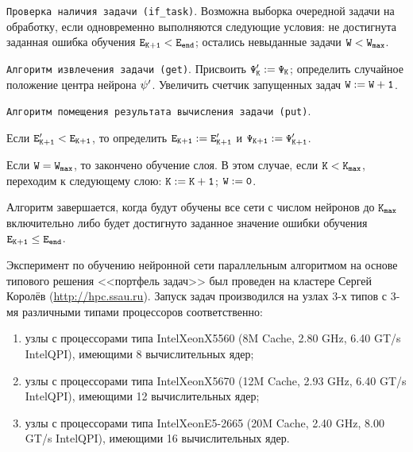{\tt Проверка наличия задачи (\verb"if_task")}. Возможна выборка очередной задачи на обработку, если одновременно выполняются следующие условия: не достигнута заданная ошибка обучения $\tt E_{K+1}<E_{end}$; остались невыданные задачи $\tt W<W_{max}$.



\smallskip



{\tt Алгоритм извлечения задачи (get)}. Присвоить $\tt \Psi'_{K}:=\Psi_{K}$; определить случайное положение центра нейрона $\tt \psi'$. Увеличить счетчик запущенных задач $\tt W:=W+1$.



\smallskip



{\tt Алгоритм помещения результата вычисления задачи (put)}. 

Если $\tt E'_{K+1}<E_{K+1}$, то определить $\tt E_{K+1}:=E'_{K+1}$ и $\tt \Psi_{K+1}:=\Psi'_{K+1}$. 

Если $\tt W=W_{max}$, то закончено обучение слоя. В этом случае, если $\tt K<K_{max}$, переходим к следующему слою: $\tt K:=K+1$; $\tt W:=0$.



\smallskip



Алгоритм завершается, когда будут обучены все сети с числом нейронов до $\tt K_{max}$ включительно либо будет достигнуто заданное значение ошибки обучения $\tt E_{K+1}\le E_{end}$.



\smallskip




Эксперимент по обучению нейронной сети параллельным алгоритмом на основе типового решения <<портфель задач>> был проведен на кластере Сергей Королёв (\url{http://hpc.ssau.ru}). Запуск задач производился на узлах 3-х типов с 3-мя различными типами процессоров соответственно:

\begin{enumerate}

\item узлы с процессорами типа Intel\textregistered Xeon\textregistered X5560 (8M Cache, 2.80 GHz, 6.40 GT/s Intel\textregistered QPI), имеющими 8 вычислительных ядер;

\item узлы с процессорами типа Intel\textregistered Xeon\textregistered X5670 (12M Cache, 2.93 GHz, 6.40 GT/s Intel\textregistered QPI), имеющими 12 вычислительных ядер;

\item узлы с процессорами типа Intel\textregistered Xeon\textregistered E5-2665 (20M Cache, 2.40 GHz, 8.00 GT/s Intel\textregistered QPI), имеющими 16 вычислительных ядер.

\end{enumerate}



